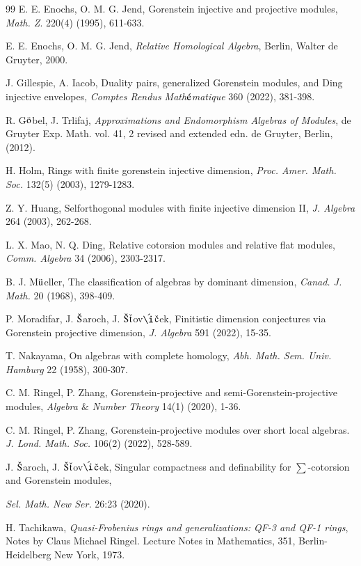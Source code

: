 \documentclass[11pt,a4paper]{article}
\begin{document}
\begin{thebibliography}{99}
  E. E. Enochs, O. M. G. Jend, Gorenstein injective and projective modules,  {\it Math. Z}. 220(4)  (1995), 611-633.

 E. E. Enochs, O. M. G. Jend, {\it Relative  Homological  Algebra},  Berlin,  Walter de Gruyter,
2000.


 J. Gillespie, A. Iacob, Duality pairs, generalized Gorenstein modules, and Ding injective
envelopes, {\it Comptes Rendus Math$\acute{{\rm e}}$matique}  360 (2022), 381-398.

 R. G$\ddot{\rm o}$bel, J. Trlifaj, {\it Approximations and Endomorphism Algebras of Modules}, de Gruyter Exp. Math. vol.
41,  2 revised and extended edn. de Gruyter, Berlin, (2012).

 H. Holm,  Rings with finite gorenstein injective dimension, {\it Proc. Amer. Math. Soc.} 132(5) (2003), 1279-1283.


 Z. Y. Huang, Selforthogonal modules with finite injective dimension II, {\it J. Algebra} 264 (2003),   262-268.

  L. X. Mao,  N. Q. Ding,  Relative cotorsion modules and relative flat modules, {\it Comm. Algebra} 34 (2006), 2303-2317.

 B. J.  M$\ddot{\rm u}$eller, The classification of algebras by dominant dimension, {\it Canad. J. Math.} 20 (1968), 398-409.

  P. Moradifar, J. $\check{\rm S}$aroch, J. $\check{\rm S}$$\check{\rm t}$ov$\acute{\rm {\i}}$$\check{\rm c}$ek,   Finitistic dimension conjectures via Gorenstein
projective dimension, {\it J. Algebra} 591 (2022), 15-35.

 T. Nakayama, On algebras with complete homology, {\it Abh. Math. Sem. Univ. Hamburg} 22  (1958), 300-307.

 C. M. Ringel, P. Zhang, Gorenstein-projective and semi-Gorenstein-projective modules, {\it Algebra $\&$   Number Theory}
14(1) (2020), 1-36.

  C. M. Ringel, P. Zhang, Gorenstein-projective modules over short local algebras. {\it J. Lond. Math. Soc.} 106(2) (2022), 528-589.

  J. $\check{\rm S}$aroch, J. $\check{\rm S}$$\check{\rm t}$ov$\acute{\rm {\i}}$$\check{\rm c}$ek,   Singular compactness and definability for $\sum$-cotorsion and Gorenstein modules,

{\it Sel. Math. New Ser.} 26:23 (2020).

 H. Tachikawa, {\it Quasi-Frobenius rings and generalizations:  QF-3 and QF-1 rings}, Notes by Claus Michael Ringel. Lecture Notes in Mathematics, 351, Berlin-Heidelberg New York, 1973.
 \end{thebibliography}
\end{document}
